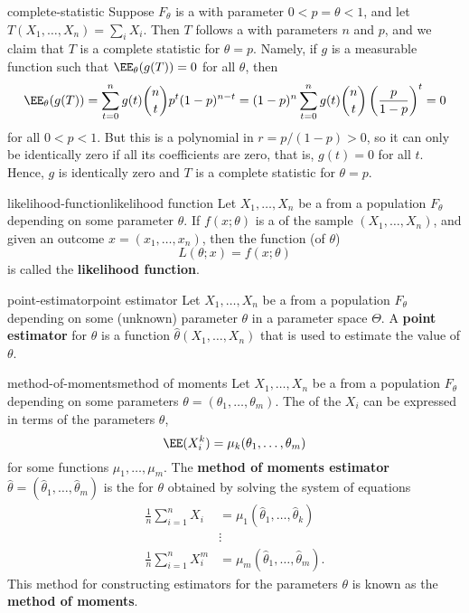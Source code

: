 \begin{example}{complete-statistic}
    Suppose $F_\theta$ is a  with parameter $0 < p = \theta < 1$, and let $T(X_1, \ldots, X_n) = \sum_i X_i$. Then $T$ follows a  with parameters $n$ and $p$, and we claim that $T$ is a complete statistic for $\theta = p$. Namely, if $g$ is a measurable function such that $\EE_\theta(g(T)) = 0$ for all $\theta$, then
    \[ \EE_\theta(g(T)) = \sum_{t = 0}^{n} g(t) \binom{n}{t} p^t (1 - p)^{n - t} = (1 - p)^n \sum_{t = 0}^{n} g(t) \binom{n}{t} \left(\frac{p}{1 - p}\right)^t = 0 \]
    for all $0 < p < 1$. But this is a polynomial in $r = p / (1 - p) > 0$, so it can only be identically zero if all its coefficients are zero, that is, $g(t) = 0$ for all $t$. Hence, $g$ is identically zero and $T$ is a complete statistic for $\theta = p$.
\end{example}

\begin{topic}{likelihood-function}{likelihood function}
    Let $X_1, \ldots, X_n$ be a  from a population $F_\theta$ depending on some parameter $\theta$. If $f(x; \theta)$ is a  of the sample $(X_1, \ldots, X_n)$, and given an outcome $x = (x_1, \ldots, x_n)$, then the function (of $\theta$)
    \[ L(\theta; x) = f(x; \theta) \]
    is called  the \textbf{likelihood function}.
\end{topic}

\begin{topic}{point-estimator}{point estimator}
    Let $X_1, \ldots, X_n$ be a  from a population $F_\theta$ depending on some (unknown) parameter $\theta$ in a parameter space $\Theta$. A \textbf{point estimator} for $\theta$ is a function $\hat{\theta}(X_1, \ldots, X_n)$ that is used to estimate the value of $\theta$.
\end{topic}

\begin{topic}{method-of-moments}{method of moments}
    Let $X_1, \ldots, X_n$ be a  from a population $F_\theta$ depending on some parameters $\theta = (\theta_1, \ldots, \theta_m)$. The  of the $X_i$ can be expressed in terms of the parameters $\theta$,
    \[ \EE(X_i^k) = \mu_k(\theta_1, \ldots, \theta_m) \]
    for some functions $\mu_1, \ldots, \mu_m$. The \textbf{method of moments estimator} $\hat{\theta} = (\hat{\theta}_1, \ldots, \hat{\theta}_m)$ is the  for $\theta$ obtained by solving the system of equations
    \[ \begin{aligned}
        \frac{1}{n} \sum_{i = 1}^{n} X_i &= \mu_1(\hat{\theta}_1, \ldots, \hat{\theta}_k) \\ 
        & \vdots \\ 
        \frac{1}{n} \sum_{i = 1}^{n} X_i^m &= \mu_m(\hat{\theta}_1, \ldots, \hat{\theta}_m) .
    \end{aligned} \]    
    This method for constructing estimators for the parameters $\theta$ is known as the \textbf{method of moments}.
\end{topic}

